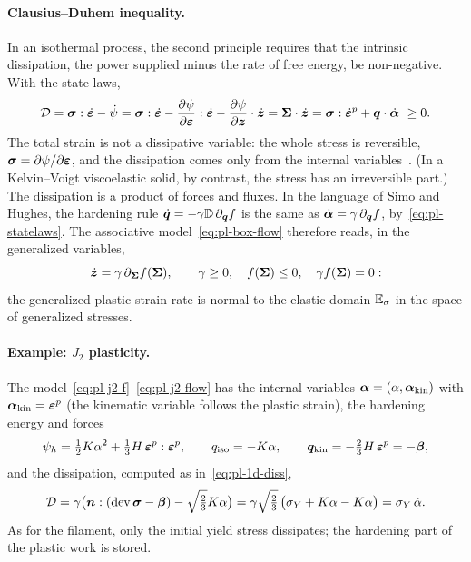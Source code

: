 \paragraph{Clausius--Duhem inequality.}
%
In an isothermal process, the second principle requires that the intrinsic
dissipation, the power supplied minus the rate of free energy, be
non-negative. With the state laws,
\begin{equation}\label{eq:pl-CD}
  \mathcal D=\bm{\sigma}:\dot{\bm{\varepsilon}}-\dot\psi
  =\bm{\sigma}:\dot{\bm{\varepsilon}}-\frac{\partial\psi}{\partial\bm{\varepsilon}}:\dot{\bm{\varepsilon}}-\frac{\partial\psi}{\partial\bm{z}}\cdot\dot{\bm{z}}
  =\bm{\Sigma}\cdot\dot{\bm{z}}=\bm{\sigma}:\dot{\bm{\varepsilon}}^p+\bm{q}\cdot\dot{\bm{\alpha}}\ \ge0 .
\end{equation}
The total strain is not a dissipative variable: the whole stress is
reversible, $\bm{\sigma}=\partial\psi/\partial\bm{\varepsilon}$, and the dissipation comes only
from the internal variables~\cite{KondoMaitournam2023}. (In a Kelvin--Voigt
viscoelastic solid, by contrast, the stress has an irreversible part.)
The dissipation is a product of forces and fluxes. In the language of Simo and
Hughes, the hardening rule $\dot{\bm{q}}=-\gamma\mathbb{D}\,\partial_{\bm{q}}f$ is the same as
$\dot{\bm{\alpha}}=\gamma\,\partial_{\bm{q}}f$, by~\eqref{eq:pl-statelaws}. The
associative model~\eqref{eq:pl-box-flow} therefore reads, in the generalized
variables,
\begin{equation}\label{eq:pl-assoc-gen}
  \dot{\bm{z}}=\gamma\,\partial_{\bm{\Sigma}}f(\bm{\Sigma}),\qquad
  \gamma\ge0,\quad f(\bm{\Sigma})\le0,\quad\gamma f(\bm{\Sigma})=0 :
\end{equation}
the generalized plastic strain rate is normal to the elastic domain $\mathbb{E}_{\sigma}$ in
the space of generalized stresses.

\paragraph{Example: $J_2$ plasticity.} The model~\eqref{eq:pl-j2-f}--\eqref{eq:pl-j2-flow}
has the internal variables $\bm{\alpha}=(\alpha,\bm{\alpha}_{\mathrm{kin}})$ with
$\bm{\alpha}_{\mathrm{kin}}=\bm{\varepsilon}^{p}$ (the kinematic variable follows the plastic
strain), the hardening energy and forces
\[
  \psi_h=\tfrac12K\alpha^2+\tfrac13H\,\bm{\varepsilon}^{p}:\bm{\varepsilon}^{p},\qquad
  q_{\mathrm{iso}}=-K\alpha,\qquad \bm{q}_{\mathrm{kin}}=-\tfrac23H\,\bm{\varepsilon}^{p}=-\bm{\beta} ,
\]
and the dissipation, computed as in~\eqref{eq:pl-1d-diss},
\begin{equation}\label{eq:pl-j2-diss}
  \mathcal D=\gamma\bigl(\bm{n}:(\operatorname{dev}\bm{\sigma}-\bm{\beta})-\sqrt{\tfrac23}K\alpha\bigr)
  =\gamma\sqrt{\tfrac23}\,\bigl(\sigma_{Y}+K\alpha-K\alpha\bigr)=\sigma_{Y}\,\dot\alpha .
\end{equation}
As for the filament, only the initial yield stress dissipates; the hardening
part of the plastic work is stored.

